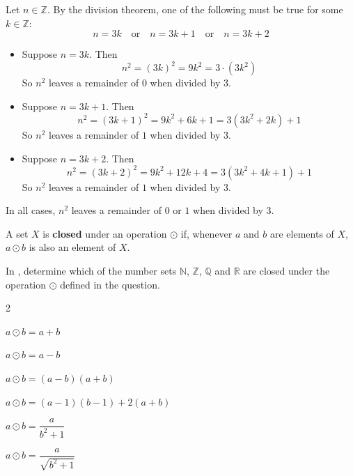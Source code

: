 \begin{myproof}
    Let $n \in \mathbb{Z}$. By the division theorem, one of the following must be true for some $k \in \mathbb{Z}$:
    \[
    n=3k \quad \text{or} \quad n=3k+1 \quad \text{or} \quad n=3k+2
    \]
    \begin{itemize}
    \item Suppose $n=3k$. Then
    \[
    n^2 = (3k)^2 = 9k^2 = 3 \cdot (3k^2)
    \]
    So $n^2$ leaves a remainder of $0$ when divided by $3$.
    \item Suppose $n=3k+1$. Then
    \[
    n^2 = (3k+1)^2 = 9k^2+6k+1 = 3(3k^2+2k)+1
    \]
    So $n^2$ leaves a remainder of $1$ when divided by $3$.
    \item Suppose $n=3k+2$. Then
    \[
    n^2 = (3k+2)^2 = 9k^2+12k+4 = 3(3k^2+4k+1)+1
    \]
    So $n^2$ leaves a remainder of $1$ when divided by $3$.
    \end{itemize}
    In all cases, $n^2$ leaves a remainder of $0$ or $1$ when divided by $3$.
\end{myproof}

\begin{definition}
A set $X$ is \textbf{closed} under an operation $\odot$ if, whenever $a$ and $b$ are elements of $X$, $a \odot b$ is also an element of $X$.
\end{definition}

In , determine which of the number sets $\mathbb{N}$, $\mathbb{Z}$, $\mathbb{Q}$ and $\mathbb{R}$ are closed under the operation $\odot$ defined in the question.

\begin{multicols}{2}
\begin{chapex}
\label{cqClosureOfNumberSetsBegin}
$a \odot b = a + b$
\end{chapex}

\begin{chapex}
$a \odot b = a - b$
\end{chapex}

\begin{chapex}
$a \odot b = (a-b)(a+b)$
\end{chapex}

\begin{chapex}
$a \odot b = (a-1)(b-1) + 2(a+b)$
\end{chapex}

\begin{chapex}
$a \odot b = \dfrac{a}{b^2+1}$
\end{chapex}

\begin{chapex}
\label{cqClosureOfNumberSetsEnd}
$a \odot b = \dfrac{a}{\sqrt{b^2+1}}$
\end{chapex}
\end{multicols}

